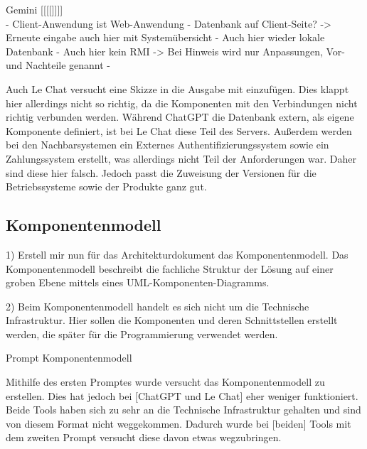 Gemini [[[[]]]]\\
    - Client-Anwendung ist Web-Anwendung
    - Datenbank auf Client-Seite?
    -> Erneute eingabe auch hier mit Systemübersicht
    - Auch hier wieder lokale Datenbank
    - Auch hier kein RMI -> Bei Hinweis wird nur Anpassungen, Vor- und Nachteile genannt
    - 

Auch Le Chat versucht eine Skizze in die Ausgabe mit einzufügen. Dies klappt hier allerdings nicht so richtig, da die Komponenten mit den Verbindungen nicht 
richtig verbunden werden. Während ChatGPT die Datenbank extern, als eigene Komponente definiert, ist bei Le Chat diese Teil des Servers. Außerdem werden bei den
Nachbarsystemen ein Externes Authentifizierungssystem sowie ein Zahlungssystem erstellt, was allerdings nicht Teil der Anforderungen war. Daher sind diese hier 
falsch. Jedoch passt die Zuweisung der Versionen für die Betriebssysteme sowie der Produkte ganz gut.\\


\subsection*{Komponentenmodell}

\begin{prompt}[H]
    \begin{tcolorbox}[colback=gray!20, colframe=gray!20, boxrule=0pt, sharp corners] 
        1) Erstell mir nun für das Architekturdokument das Komponentenmodell. Das Komponentenmodell beschreibt die fachliche Struktur der Lösung auf 
        einer groben Ebene mittels eines UML-Komponenten-Diagramms.
        
        2) Beim Komponentenmodell handelt es sich nicht um die Technische Infrastruktur. Hier sollen die Komponenten und deren Schnittstellen erstellt 
        werden, die später für die Programmierung verwendet werden.
        \vfill
    \end{tcolorbox}
    \caption{Prompt Komponentenmodell}
    \label{Prompt Komponentenmodell}
\end{prompt}

Mithilfe des ersten Promptes wurde versucht das Komponentenmodell zu erstellen. Dies hat jedoch bei [ChatGPT und Le Chat] eher weniger funktioniert.
Beide Tools haben sich zu sehr an die Technische Infrastruktur gehalten und sind von diesem Format nicht weggekommen. Dadurch wurde bei [beiden] Tools
mit dem zweiten Prompt versucht diese davon etwas wegzubringen.\\

